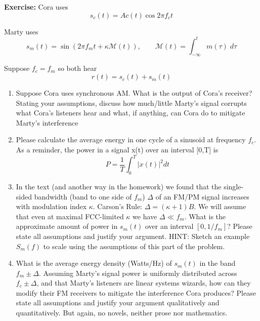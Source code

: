 \documentclass[12pt]{article}
\newcommand{\M}{\mathcal{M}}
\newenvironment*{exercise}[1][red]{
    \begin{tcolorbox}[
        parbox=false,
        colback=#1!5!white,
        colframe=#1!75!black,
        breakable
    ]}
    {\end{tcolorbox}}
\begin{document}
\begin{exercise}
    \textbf{Exercise:} Cora uses 
    \[s_c(t) = Ac(t) \cos 2\pi f_c t\]

    Marty uses 
    \[s_m(t) = \sin(2\pi f_m t + \kappa \M(t)), \qquad \M(t) = \int_{-\infty}^t m(\tau)\; d\tau\]

    Suppose $f_c = f_m$ so both hear 
    \[r(t) = s_c(t) + s_m(t)\]

    \begin{enumerate}
        \item Suppose Cora uses synchronous AM. What is the output of Cora's receiver? Stating your assumptions, discuss how much/little Marty's signal corrupts what Cora's listeners hear and what, if anything, can Cora do to mitigate Marty's interference
        
        \item Please calculate the average energy in one cycle of a sinusoid at frequency $f_c$. As a reminder, the power in a signal x(t) over an interval [0,T] is
        \[P = \frac{1}{T} \int_0^T |x(t)|^2 dt\]

        \item  In the text (and another way in the homework) we found that the single-sided
        bandwidth (band to one side of $f_m$) $\Delta$ of an FM/PM signal increases with modulation
        index $\kappa$. Carson's Rule: $\Delta = (\kappa + 1)B$. We will assume that even at maximal FCC-limited $\kappa$ we have $\Delta \ll f_m$. What is the approximate amount of power in $s_m(t)$ over
        an interval $[0,1/f_m]$? Please state all assumptions and justify your argument.
        HINT: Sketch an example $S_m(f)$ to scale using the assumptions of this part of the
        problem.

        \item What is the average energy density (Watts/Hz) of $s_m(t)$ in the band $f_m \pm \Delta$. Assuming Marty's signal power is uniformly distributed across $f_c \pm \Delta$, and that Marty's listeners are linear systems wizards, how can they modify their FM receivers to mitigate the interference Cora produces? Please state all assumptions and justify your argument qualitatively and quantitatively. But again, no novels, neither prose nor mathematics.

    \end{enumerate}
\end{exercise}
\end{document}

